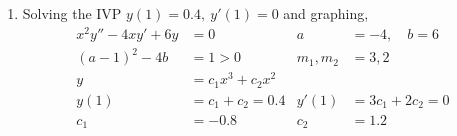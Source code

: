 \begin{enumerate}
    \item Solving the IVP $ y(1) = 0.4,\ y'(1) = 0 $ and graphing,
          \begin{align}
              x^{2}y'' - 4xy' + 6y & = 0                       &
              a                    & = -4, \quad b= 6            \\
              (a-1)^{2}-4b         & = 1 > 0                   &
              m_{1}, m_{2}         & =  3, 2                     \\
              y                    & = c_{1}x^{3} + c_{2}x^{2}   \\
              y(1)                 & = c_{1} + c_{2} = 0.4     &
              y'(1)                & = 3c_{1} + 2c_{2} = 0       \\
              c_{1}                & = -0.8                    &
              c_{2}                & = 1.2
          \end{align}
          \begin{figure}[H]
              \centering
          \end{figure}


\end{enumerate}
